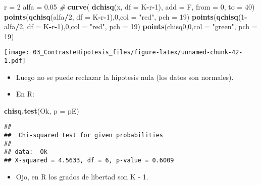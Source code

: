 \documentclass[]{article}
\newenvironment{Shaded}{\begin{snugshade}}{\end{snugshade}}
\newcommand{\KeywordTok}[1]{\textcolor[rgb]{0.13,0.29,0.53}{\textbf{#1}}}
\newcommand{\DataTypeTok}[1]{\textcolor[rgb]{0.13,0.29,0.53}{#1}}
\newcommand{\DecValTok}[1]{\textcolor[rgb]{0.00,0.00,0.81}{#1}}
\newcommand{\FloatTok}[1]{\textcolor[rgb]{0.00,0.00,0.81}{#1}}
\newcommand{\StringTok}[1]{\textcolor[rgb]{0.31,0.60,0.02}{#1}}
\newcommand{\CommentTok}[1]{\textcolor[rgb]{0.56,0.35,0.01}{\textit{#1}}}
\newcommand{\OperatorTok}[1]{\textcolor[rgb]{0.81,0.36,0.00}{\textbf{#1}}}
\newcommand{\NormalTok}[1]{#1}
\providecommand{\tightlist}{%
  \setlength{\itemsep}{0pt}\setlength{\parskip}{0pt}}
\begin{document}
\begin{Shaded}
\begin{Highlighting}[]
\NormalTok{r =}\StringTok{ }\DecValTok{2}
\NormalTok{alfa =}\StringTok{ }\FloatTok{0.05}
\CommentTok{#}
\KeywordTok{curve}\NormalTok{( }\KeywordTok{dchisq}\NormalTok{(x, }\DataTypeTok{df =}\NormalTok{ K}\OperatorTok{-}\NormalTok{r}\OperatorTok{-}\DecValTok{1}\NormalTok{), }\DataTypeTok{add =}\NormalTok{ F, }\DataTypeTok{from =} \DecValTok{0}\NormalTok{, }\DataTypeTok{to =} \DecValTok{40}\NormalTok{)}
\KeywordTok{points}\NormalTok{(}\KeywordTok{qchisq}\NormalTok{(alfa}\OperatorTok{/}\DecValTok{2}\NormalTok{, }\DataTypeTok{df =}\NormalTok{ K}\OperatorTok{-}\NormalTok{r}\OperatorTok{-}\DecValTok{1}\NormalTok{),}\DecValTok{0}\NormalTok{,}\DataTypeTok{col =} \StringTok{"red"}\NormalTok{, }\DataTypeTok{pch =} \DecValTok{19}\NormalTok{)}
\KeywordTok{points}\NormalTok{(}\KeywordTok{qchisq}\NormalTok{(}\DecValTok{1}\OperatorTok{-}\NormalTok{alfa}\OperatorTok{/}\DecValTok{2}\NormalTok{, }\DataTypeTok{df =}\NormalTok{ K}\OperatorTok{-}\NormalTok{r}\OperatorTok{-}\DecValTok{1}\NormalTok{),}\DecValTok{0}\NormalTok{,}\DataTypeTok{col =} \StringTok{"red"}\NormalTok{, }\DataTypeTok{pch =} \DecValTok{19}\NormalTok{)}
\KeywordTok{points}\NormalTok{(chisq0,}\DecValTok{0}\NormalTok{,}\DataTypeTok{col =} \StringTok{"green"}\NormalTok{, }\DataTypeTok{pch =} \DecValTok{19}\NormalTok{)}
\end{Highlighting}
\end{Shaded}

\texttt{[image: 03\_ContrasteHipotesis\_files/figure-latex/unnamed-chunk-42-1.pdf]}

\begin{itemize}
\item
  Luego no se puede rechazar la hipotesis nula (los datos son normales).
\item
  En R:
\end{itemize}

\begin{Shaded}
\begin{Highlighting}[]
\KeywordTok{chisq.test}\NormalTok{(Ok, }\DataTypeTok{p =}\NormalTok{ pE)}
\end{Highlighting}
\end{Shaded}

\begin{verbatim}
## 
##  Chi-squared test for given probabilities
## 
## data:  Ok
## X-squared = 4.5633, df = 6, p-value = 0.6009
\end{verbatim}

\begin{itemize}
\tightlist
\item
  Ojo, en R los grados de libertad son K - 1.
\end{itemize}
\end{document}

